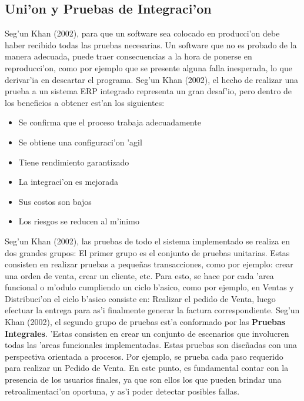 \subsection{Uni'on y Pruebas de Integraci'on}
	Seg'un Khan (2002), para que un software sea colocado en producci'on debe haber recibido todas las pruebas necesarias. Un software que no es probado de la manera adecuada, puede traer consecuencias a la hora de ponerse en reproducci'on, como por ejemplo que se presente alguna falla inesperada, lo que derivar'ia en descartar el programa.
	Seg'un Khan (2002), el hecho de realizar una prueba a un sistema ERP integrado representa un gran desaf'io, pero dentro de los beneficios a obtener est'an los siguientes: 
\begin{itemize}
\item Se confirma que el proceso trabaja adecuadamente
\item Se obtiene una configuraci'on 'agil
\item Tiene rendimiento garantizado
\item La integraci'on es mejorada
\item Sus costos son bajos
\item Los riesgos se reducen al m'inimo
\end{itemize}
\indent Seg'un Khan (2002), las pruebas de todo el sistema implementado se realiza en dos grandes grupos: El primer grupo es el conjunto de pruebas unitarias. Estas consisten en realizar pruebas a peque\~nas transacciones, como por ejemplo: crear una orden de venta, crear un cliente, etc. Para esto, se hace por cada 'area funcional o m'odulo cumpliendo un ciclo b'asico, como por ejemplo, en Ventas y Distribuci'on el ciclo b'asico consiste en: Realizar el pedido de Venta, luego efectuar la entrega para as'i finalmente generar la factura correspondiente. 
\newline
\newline
\indent Seg'un Khan (2002), el segundo grupo de pruebas est'a conformado por las \textbf{Pruebas Integrales}. 'Estas consisten en crear un conjunto de escenarios que involucren todas las 'areas funcionales implementadas. Estas pruebas son dise\~nadas con una perspectiva orientada a procesos. Por ejemplo, se prueba cada paso requerido para realizar un Pedido de Venta. En este punto, es fundamental contar con la presencia de los usuarios finales, ya que son ellos los que pueden brindar una retroalimentaci'on oportuna, y as'i poder detectar posibles fallas.
\newline
\newline
